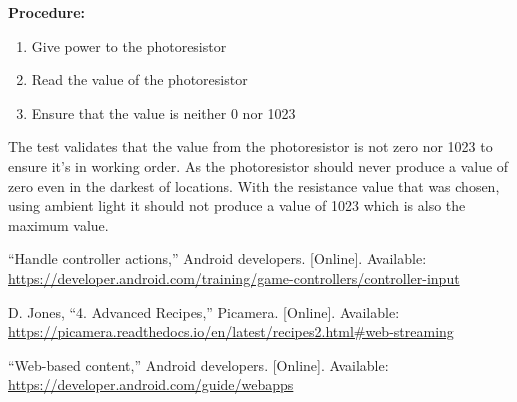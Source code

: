 \documentclass[letterpaper,12pt]{report}
\begin{document}
    \textbf{Procedure:}
    \begin{enumerate}
        \item  Give power to the photoresistor
        \item Read the value of the photoresistor
        \item Ensure that the value is neither 0 nor 1023
    \end{enumerate}

    The test validates that the value from the photoresistor is not zero nor
    1023 to ensure it’s in working order. As the photoresistor should never
    produce a value of zero even in the darkest of locations. With the
    resistance value that was chosen, using ambient light it should not produce
    a value of 1023 which is also the maximum value.

    \begin{thebibliography}{9}
        “Handle controller actions,” Android developers. [Online]. Available:
        \\\url{https://developer.android.com/training/game-controllers/controller-input}

        D. Jones, “4. Advanced Recipes,” Picamera. [Online]. Available:
        \\\url{https://picamera.readthedocs.io/en/latest/recipes2.html#web-streaming}

        “Web-based content,” Android developers. [Online]. Available:
        \\\url{https://developer.android.com/guide/webapps}
    \end{thebibliography}
\end{document}
